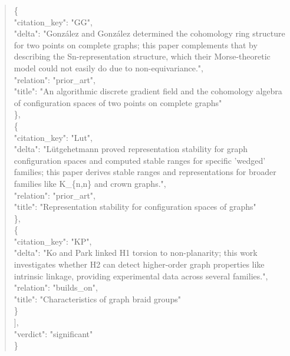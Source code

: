 \documentclass[11pt]{article}
\begin{document}
\begin{quote}
    \{\\
      "citation\_key": "GG",\\
      "delta": "González and González determined the cohomology ring structure for two points on complete graphs; this paper complements that by describing the Sn-representation structure, which their Morse-theoretic model could not easily do due to non-equivariance.",\\
      "relation": "prior\_art",\\
      "title": "An algorithmic discrete gradient field and the cohomology algebra of configuration spaces of two points on complete graphs"\\
    \},\\
    \{\\
      "citation\_key": "Lut",\\
      "delta": "Lütgehetmann proved representation stability for graph configuration spaces and computed stable ranges for specific 'wedged' families; this paper derives stable ranges and representations for broader families like K\_\{n,n\} and crown graphs.",\\
      "relation": "prior\_art",\\
      "title": "Representation stability for configuration spaces of graphs"\\
    \},\\
    \{\\
      "citation\_key": "KP",\\
      "delta": "Ko and Park linked H1 torsion to non-planarity; this work investigates whether H2 can detect higher-order graph properties like intrinsic linkage, providing experimental data across several families.",\\
      "relation": "builds\_on",\\
      "title": "Characteristics of graph braid groups"\\
    \}\\
  ],\\
  "verdict": "significant"\\
\}\\
\end{quote}
\end{document}
